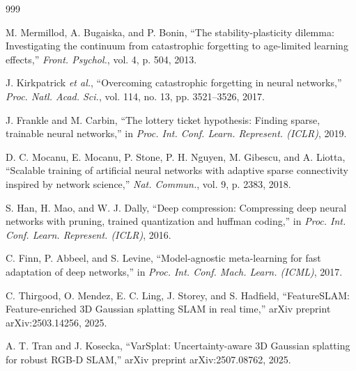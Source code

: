 \documentclass[12pt,a4paper,oneside]{report}
\begin{document}
\begin{thebibliography}{999}

M. Mermillod, A. Bugaiska, and P. Bonin, ``The stability-plasticity dilemma: Investigating the continuum from catastrophic forgetting to age-limited learning effects,'' \textit{Front. Psychol.}, vol. 4, p. 504, 2013.




J. Kirkpatrick \textit{et al.}, ``Overcoming catastrophic forgetting in neural networks,'' \textit{Proc. Natl. Acad. Sci.}, vol. 114, no. 13, pp. 3521--3526, 2017.




J. Frankle and M. Carbin, ``The lottery ticket hypothesis: Finding sparse, trainable neural networks,'' in \textit{Proc. Int. Conf. Learn. Represent. (ICLR)}, 2019.




D. C. Mocanu, E. Mocanu, P. Stone, P. H. Nguyen, M. Gibescu, and A. Liotta, ``Scalable training of artificial neural networks with adaptive sparse connectivity inspired by network science,'' \textit{Nat. Commun.}, vol. 9, p. 2383, 2018.




S. Han, H. Mao, and W. J. Dally, ``Deep compression: Compressing deep neural networks with pruning, trained quantization and huffman coding,'' in \textit{Proc. Int. Conf. Learn. Represent. (ICLR)}, 2016.




C. Finn, P. Abbeel, and S. Levine, ``Model-agnostic meta-learning for fast adaptation of deep networks,'' in \textit{Proc. Int. Conf. Mach. Learn. (ICML)}, 2017.




C. Thirgood, O. Mendez, E. C. Ling, J. Storey, and S. Hadfield, ``{FeatureSLAM}: Feature-enriched {3D} Gaussian splatting {SLAM} in real time,'' arXiv preprint arXiv:2503.14256, 2025.




A. T. Tran and J. Kosecka, ``{VarSplat}: Uncertainty-aware {3D} Gaussian splatting for robust {RGB-D} {SLAM},'' arXiv preprint arXiv:2507.08762, 2025.




\end{thebibliography}
\end{document}
